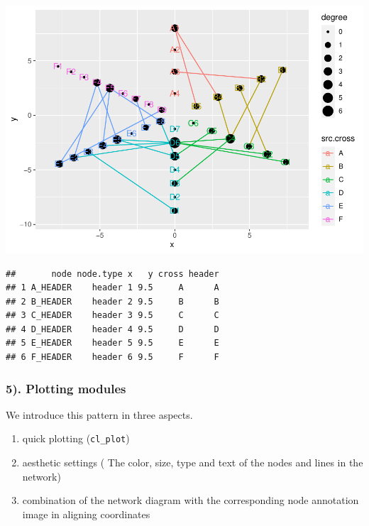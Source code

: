 \documentclass[
]{article}
\newenvironment{Shaded}{\begin{snugshade}}{\end{snugshade}}
\newcommand{\CommentTok}[1]{\textcolor[rgb]{0.56,0.35,0.01}{\textit{#1}}}
\newcommand{\DataTypeTok}[1]{\textcolor[rgb]{0.13,0.29,0.53}{#1}}
\newcommand{\KeywordTok}[1]{\textcolor[rgb]{0.13,0.29,0.53}{\textbf{#1}}}
\newcommand{\NormalTok}[1]{#1}
\newcommand{\OperatorTok}[1]{\textcolor[rgb]{0.81,0.36,0.00}{\textbf{#1}}}
\newcommand{\StringTok}[1]{\textcolor[rgb]{0.31,0.60,0.02}{#1}}
\providecommand{\tightlist}{%
  \setlength{\itemsep}{0pt}\setlength{\parskip}{0pt}}
\begin{document}
\includegraphics{ReadMe_files/figure-latex/unnamed-chunk-7-6.pdf}

\begin{Shaded}
\end{Shaded}

\begin{verbatim}
##       node node.type x   y cross header
## 1 A_HEADER    header 1 9.5     A      A
## 2 B_HEADER    header 2 9.5     B      B
## 3 C_HEADER    header 3 9.5     C      C
## 4 D_HEADER    header 4 9.5     D      D
## 5 E_HEADER    header 5 9.5     E      E
## 6 F_HEADER    header 6 9.5     F      F
\end{verbatim}

\hypertarget{plotting-modules}{%
\subsubsection{5). Plotting modules}\label{plotting-modules}}

We introduce this pattern in three aspects.

\begin{enumerate}
\def\labelenumi{\alph{enumi}.}
\tightlist
\item
  quick plotting (\texttt{cl\_plot})
\item
  aesthetic settings ( The color, size, type and text of the nodes and
  lines in the network)
\item
  combination of the network diagram with the corresponding node
  annotation image in aligning coordinates
\end{enumerate}
\end{document}
